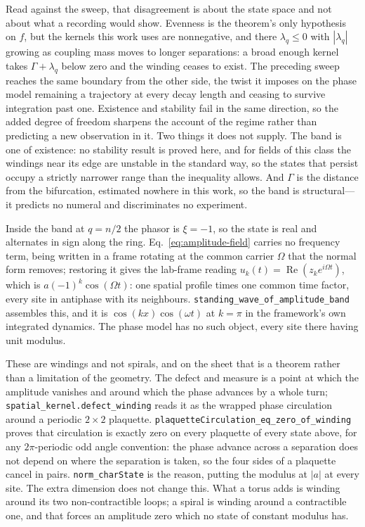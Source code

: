 \documentclass{article}
\renewcommand{\cite}[1]{\citep{#1}}
\begin{document}
Read against the sweep, that disagreement is about the state space and not about what a recording would show. Evenness is the theorem's only hypothesis on $f$, but the kernels this work uses are nonnegative, and there $\lambda_q\leq0$ with $|\lambda_q|$ growing as coupling mass moves to longer separations: a broad enough kernel takes $\Gamma+\lambda_q$ below zero and the winding ceases to exist. The preceding sweep reaches the same boundary from the other side, the twist it imposes on the phase model remaining a trajectory at every decay length and ceasing to survive integration past one. Existence and stability fail in the same direction, so the added degree of freedom sharpens the account of the regime rather than predicting a new observation in it. Two things it does not supply. The band is one of existence: no stability result is proved here, and for fields of this class the windings near its edge are unstable in the standard way, so the states that persist occupy a strictly narrower range than the inequality allows. And $\Gamma$ is the distance from the bifurcation, estimated nowhere in this work, so the band is structural---it predicts no numeral and discriminates no experiment.

Inside the band at $q=n/2$ the phasor is $\xi=-1$, so the state is real and alternates in sign along the ring. Eq.~\eqref{eq:amplitude-field} carries no frequency term, being written in a frame rotating at the common carrier $\Omega$ that the normal form removes; restoring it gives the lab-frame reading $u_k(t)=\operatorname{Re}(z_ke^{i\Omega t})$, which is $a(-1)^k\cos(\Omega t)$: one spatial profile times one common time factor, every site in antiphase with its neighbours. \nolinkurl{standing_wave_of_amplitude_band} assembles this, and it is $\cos(kx)\cos(\omega t)$ at $k=\pi$ in the framework's own integrated dynamics. The phase model has no such object, every site there having unit modulus.

These are windings and not spirals, and on the sheet that is a theorem rather than a limitation of the geometry. The defect \cite{townsend2015} and \cite{xu2023} measure is a point at which the amplitude vanishes and around which the phase advances by a whole turn; \texttt{spatial\_kernel.defect\_winding} reads it as the wrapped phase circulation around a periodic $2\times2$ plaquette. \nolinkurl{plaquetteCirculation_eq_zero_of_winding} proves that circulation is exactly zero on every plaquette of every state above, for any $2\pi$-periodic odd angle convention: the phase advance across a separation does not depend on where the separation is taken, so the four sides of a plaquette cancel in pairs. \nolinkurl{norm_charState} is the reason, putting the modulus at $|a|$ at every site. The extra dimension does not change this. What a torus adds is winding around its two non-contractible loops; a spiral is winding around a contractible one, and that forces an amplitude zero which no state of constant modulus has.
\end{document}
